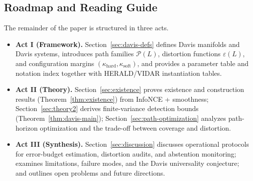 \documentclass[11pt]{article}
\theoremstyle{remark}
\theoremstyle{plain}
\begin{document}
\subsection{Roadmap and Reading Guide}
\label{sec:roadmap}

The remainder of the paper is structured in three acts.

\begin{itemize}[leftmargin=*]
    \item \textbf{Act I (Framework).} Section~\ref{sec:davis-defs} defines 
    Davis manifolds and Davis systems, introduces path families $\mathcal{P}(L)$, 
    distortion functions $\varepsilon(L)$, and configuration margins 
    $(\kappa_{\mathrm{hard}}, \kappa_{\mathrm{soft}})$, and provides a 
    parameter table and notation index together with HERALD/VIDAR instantiation 
    tables.
    
    \item \textbf{Act II (Theory).} Section~\ref{sec:existence} proves existence 
    and construction results (Theorem~\ref{thm:existence}) from InfoNCE + smoothness; 
    Section~\ref{sec:theory2} derives finite-variance detection bounds 
    (Theorem~\ref{thm:davis-main}); Section~\ref{sec:path-optimization} 
    analyzes path-horizon optimization and the trade-off between coverage and 
    distortion.
    
    \item \textbf{Act III (Synthesis).} Section~\ref{sec:discussion} discusses 
    operational protocols for error-budget estimation, distortion audits, and 
    abstention monitoring; examines limitations, failure modes, and the Davis 
    universality conjecture; and outlines open problems and future directions.
\end{itemize}
\end{document}
